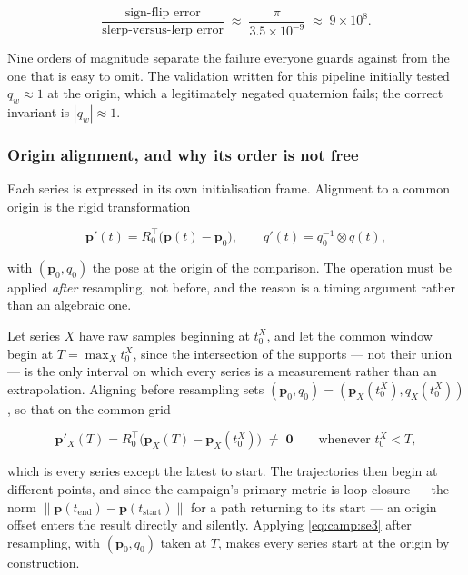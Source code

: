 \begin{equation}
  \frac{\text{sign-flip error}}{\text{slerp-versus-lerp error}}
  \;\approx\; \frac{\pi}{3.5\times10^{-9}}
  \;\approx\; 9\times10^{8}.
\end{equation}

Nine orders of magnitude separate the failure everyone guards against from the
one that is easy to omit. The validation written for this pipeline initially
tested $q_w \approx 1$ at the origin, which a legitimately negated quaternion
fails; the correct invariant is $|q_w| \approx 1$.

\subsubsection{Origin alignment, and why its order is not free}

Each series is expressed in its own initialisation frame. Alignment to a common
origin is the rigid transformation

\begin{equation}
  \mathbf{p}'(t) = R_0^{\top}\big(\mathbf{p}(t) - \mathbf{p}_0\big),
  \qquad
  q'(t) = q_0^{-1} \otimes q(t),
  \label{eq:camp:se3}
\end{equation}

with $(\mathbf{p}_0, q_0)$ the pose at the origin of the comparison. The
operation must be applied \emph{after} resampling, not before, and the reason
is a timing argument rather than an algebraic one.

Let series $X$ have raw samples beginning at $t^X_0$, and let the common window
begin at $T = \max_X t^X_0$, since the intersection of the supports --- not
their union --- is the only interval on which every series is a measurement
rather than an extrapolation. Aligning before resampling sets
$(\mathbf{p}_0,q_0) = (\mathbf{p}_X(t^X_0), q_X(t^X_0))$, so that on the common
grid

\begin{equation}
  \mathbf{p}'_X(T) = R_0^{\top}\big(\mathbf{p}_X(T) - \mathbf{p}_X(t^X_0)\big)
  \;\ne\; \mathbf{0}
  \qquad\text{whenever } t^X_0 < T,
\end{equation}

which is every series except the latest to start. The trajectories then begin
at different points, and since the campaign's primary metric is loop closure
--- the norm $\|\mathbf{p}(t_{\text{end}})-\mathbf{p}(t_{\text{start}})\|$ for
a path returning to its start --- an origin offset enters the result directly
and silently. Applying \eqref{eq:camp:se3} after resampling, with
$(\mathbf{p}_0,q_0)$ taken at $T$, makes every series start at the origin by
construction.

